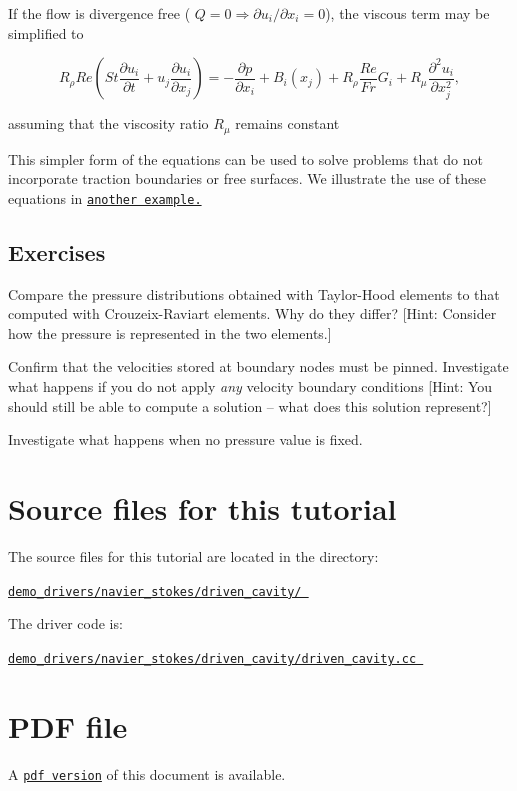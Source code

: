 If the flow is divergence free ( $ Q = 0 \Longrightarrow \partial u_i/\partial x_i =0$), the viscous term may be simplified to \begin{center} \[ R_\rho Re \left( St \frac{\partial u_i}{\partial t} + u_j \frac{\partial u_i}{\partial x_j} \right) = - \frac{\partial p}{\partial x_i} + B_i(x_j) + R_\rho \frac{Re}{Fr} G_i + R_\mu \frac{\partial^2 u_i }{\partial x_j^2}, \] \end{center}  assuming that the viscosity ratio $ R_\mu $ remains constant

This simpler form of the equations can be used to solve problems that do not incorporate traction boundaries or free surfaces. We illustrate the use of these equations in \href{../../circular_driven_cavity/html/index.html}{\tt another example.}\hypertarget{index_exercises}{}\subsection{Exercises}\label{index_exercises}

\begin{DoxyEnumerate}
\item Compare the pressure distributions obtained with Taylor-\/\+Hood elements to that computed with Crouzeix-\/\+Raviart elements. Why do they differ? \mbox{[}Hint\+: Consider how the pressure is represented in the two elements.\mbox{]}
\item Confirm that the velocities stored at boundary nodes must be pinned. Investigate what happens if you do not apply {\itshape any} velocity boundary conditions \mbox{[}Hint\+: You should still be able to compute a solution -- what does this solution represent?\mbox{]}
\item Investigate what happens when no pressure value is fixed.
\end{DoxyEnumerate}



 

\hypertarget{index_sources}{}\section{Source files for this tutorial}\label{index_sources}

\begin{DoxyItemize}
\item The source files for this tutorial are located in the directory\+: \begin{center} \href{../../../../demo_drivers/navier_stokes/driven_cavity/}{\tt demo\+\_\+drivers/navier\+\_\+stokes/driven\+\_\+cavity/ } \end{center} 
\item The driver code is\+: \begin{center} \href{../../../../demo_drivers/navier_stokes/driven_cavity/driven_cavity.cc}{\tt demo\+\_\+drivers/navier\+\_\+stokes/driven\+\_\+cavity/driven\+\_\+cavity.\+cc } \end{center} 
\end{DoxyItemize}



 

 \hypertarget{index_pdf}{}\section{P\+D\+F file}\label{index_pdf}
A \href{../latex/refman.pdf}{\tt pdf version} of this document is available. 
